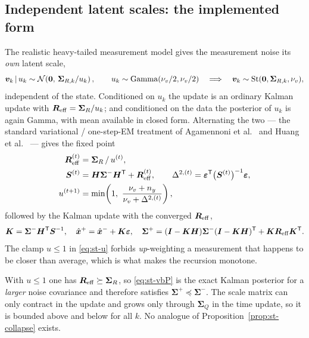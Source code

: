 \subsection{Independent latent scales: the implemented form}\label{sec:st-vb}
The realistic heavy-tailed measurement model gives the measurement noise its \emph{own} latent
scale,
\begin{equation}
\bm{v}_k\,|\,u_k\sim\mathcal{N}\!\left(\bm 0,\,\bm\Sigma_{R,k}/u_k\right),\qquad
u_k\sim\mathrm{Gamma}(\nu_v/2,\nu_v/2)
\quad\Longrightarrow\quad
\bm{v}_k\sim\mathrm{St}(\bm 0,\bm\Sigma_{R,k},\nu_v),
\label{eq:st-mix}
\end{equation}
independent of the state.  Conditioned on $u_k$ the update is an ordinary Kalman update with
$\bm{R}_{\mathrm{eff}}=\bm\Sigma_R/u_k$; and conditioned on the data the posterior of $u_k$ is again
Gamma, with mean available in closed form.  Alternating the two --- the standard variational /
one-step-EM treatment of Agamennoni et al.\ \cite{agamennoni2012heavytailed} and Huang et al.\
\cite{huang2016robustt} --- gives the fixed point
\begin{align}
\mR_{\mathrm{eff}}^{(t)}&=\bm\Sigma_{R}\,/\,u^{(t)}, \label{eq:st-Reff}\\
\mS^{(t)}&=\mH\bm\Sigma^-\mH^\T+\mR_{\mathrm{eff}}^{(t)},\qquad
\Delta^{2,(t)}=\veps^\T\big(\mS^{(t)}\big)^{-1}\veps, \label{eq:st-Dvb}\\
u^{(t+1)}&=\min\!\left(1,\ \frac{\nu_v+n_y}{\nu_v+\Delta^{2,(t)}}\right), \label{eq:st-u}
\end{align}
followed by the Kalman update with the converged $\bm{R}_{\mathrm{eff}}$,
\begin{equation}
\bm{K}=\bm\Sigma^-\bm{H}^{\mathsf{T}}\bm{S}^{-1},\quad \hat{\bm{x}}^{+}=\hat{\bm{x}}^{-}+\bm{K}\bm{\varepsilon},\quad
\bm\Sigma^+=(\bm{I}-\bm{K}\bm{H})\bm\Sigma^-(\bm{I}-\bm{K}\bm{H})^{\mathsf{T}}+\bm{K}\bm{R}_{\mathrm{eff}}\bm{K}^{\mathsf{T}}.
\label{eq:st-vbP}
\end{equation}
The clamp $u\le1$ in \eqref{eq:st-u} forbids \emph{up}-weighting a measurement that happens to be
closer than average, which is what makes the recursion monotone.

\begin{proposition}\label{prop:st-stable}
With $u\le1$ one has $\bm{R}_{\mathrm{eff}}\succeq\bm\Sigma_R$, so \eqref{eq:st-vbP} is the exact
Kalman posterior for a \emph{larger} noise covariance and therefore satisfies
$\bm\Sigma^+\preceq\bm\Sigma^-$.  The scale matrix can only contract in the update and grows only
through $\bm\Sigma_Q$ in the time update, so it is bounded above and below for all $k$.  No
analogue of Proposition~\ref{prop:st-collapse} exists.
\end{proposition}


